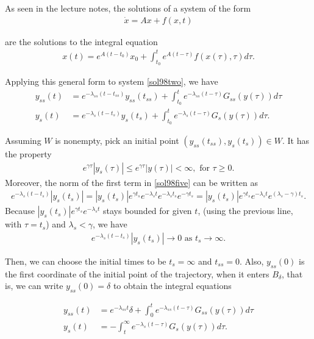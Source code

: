 \begin{solution}[9.8]
As seen in the lecture notes, the solutions of a system of the form
\begin{align}
\dot{x} = Ax + f(x,t)
\end{align}

are the solutions to the integral equation
\begin{align}
x(t) = e^{A(t-t_0)}x_0 + \int_{t_0}^t e^{A(t-\tau)}f(x(\tau),\tau)d\tau.
\end{align}

Applying this general form to system \eqref{sol98two}, we have
\begin{align}
y_{ss}(t) &= e^{-\lambda_{ss}(t-t_{ss})}y_{ss}(t_{ss}) + \int_{t_0}^t e^{-\lambda_{ss}(t-\tau)}G_{ss}(y(\tau))d\tau \\
\label{sol98five}
y_s(t) &= e^{-\lambda_s(t-t_s)}y_s(t_s) + \int_{t_0}^t e^{-\lambda_s(t-\tau)}G_s(y(\tau))d\tau. 
\end{align}

Assuming $W$ is nonempty, pick an initial point $(y_{ss}(t_{ss}), y_s(t_s))\in W$. It has the property 
\begin{align}
e^{\gamma \tau}|y_s(\tau)| \leq e^{\gamma \tau}|y(\tau)| < \infty, \text{ for } \tau \geq 0.
\end{align}
Moreover, the norm of the first term in \eqref{sol98five} can be written as
\begin{align}
e^{-\lambda_s(t-t_s)}|y_s(t_s)| = |y_s(t_s)|e^{\gamma t_s} e^{-\lambda_s t}e^{-\lambda_s t_s}e^{-\gamma t_s} = |y_s(t_s)|e^{\gamma t_s} e^{-\lambda_s t} e^{(\lambda_s - \gamma)t_s}.
\end{align}
Because $|y_s(t_s)|e^{\gamma t_s} e^{-\lambda_s t}$ stays bounded for given $t$, (using the previous line, with $\tau = t_s$) and $\lambda_s<\gamma$, we have 
\begin{align}
e^{-\lambda_s(t-t_s)}|y_s(t_s)| \to 0 \text{ as } t_s \to \infty.
\end{align}

Then, we can choose the initial times to be $t_s = \infty$ and $t_{ss}=0$. Also, $y_{ss}(0)$ is the first coordinate of the initial point of the trajectory, when it enters $B_\delta$, that is, we can write $y_{ss}(0)=\delta$ to obtain the integral equations

\begin{align}
\label{sol98six}
y_{ss}(t) &= e^{-\lambda_{ss}t}\delta + \int_{0}^t e^{-\lambda_{ss}(t-\tau)}G_{ss}(y(\tau))d\tau \\
\label{sol98seven}
y_s(t) &= - \int_{t}^\infty e^{-\lambda_s(t-\tau)}G_s(y(\tau))d\tau. 
\end{align}


\end{solution}
